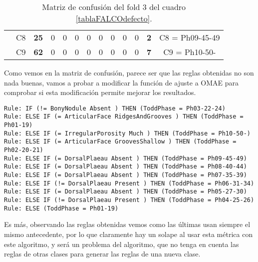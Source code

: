 \begin{table}[H]
{\begin{tabular}{|ccccccccccccc|}
\multicolumn{1}{|c|}{}                                      & \multicolumn{1}{c|}{C8} & \multicolumn{1}{c|}{\textbf{25}} & \multicolumn{1}{c|}{0}          & \multicolumn{1}{c|}{0}          & \multicolumn{1}{c|}{0}  & \multicolumn{1}{c|}{0}  & \multicolumn{1}{c|}{0}  & \multicolumn{1}{c|}{0}  & \multicolumn{1}{c|}{0}  & \multicolumn{1}{c|}{0}  & \multicolumn{1}{c|}{\textbf{2}} & C8 = Ph09-45-49   \\ \cline{2-13}
\multicolumn{1}{|c|}{}                                      & \multicolumn{1}{c|}{C9} & \multicolumn{1}{c|}{\textbf{62}} & \multicolumn{1}{c|}{0}          & \multicolumn{1}{c|}{0}          & \multicolumn{1}{c|}{0}  & \multicolumn{1}{c|}{0}  & \multicolumn{1}{c|}{0}  & \multicolumn{1}{c|}{0}  & \multicolumn{1}{c|}{0}  & \multicolumn{1}{c|}{0}  & \multicolumn{1}{c|}{\textbf{7}} & C9 = Ph10-50-     \\ \hline
\end{tabular}%
}
\caption{Matriz de confusión del fold 3 del cuadro \ref{tablaFALCOdefecto}.}
\end{table}

Como vemos en la matriz de confusión, parece ser que las reglas obtenidas no son nada buenas, vamos a probar a modificar la función de ajuste a OMAE para comprobar si esta modificación permite mejorar los resultados.

\begin{lstlisting}
Rule: IF (!= BonyNodule Absent ) THEN (ToddPhase = Ph03-22-24)
Rule: ELSE IF (= ArticularFace RidgesAndGrooves ) THEN (ToddPhase = Ph01-19)
Rule: ELSE IF (= IrregularPorosity Much ) THEN (ToddPhase = Ph10-50-)
Rule: ELSE IF (= ArticularFace GroovesShallow ) THEN (ToddPhase = Ph02-20-21)
Rule: ELSE IF (= DorsalPlaeau Absent ) THEN (ToddPhase = Ph09-45-49)
Rule: ELSE IF (= DorsalPlaeau Absent ) THEN (ToddPhase = Ph08-40-44)
Rule: ELSE IF (= DorsalPlaeau Absent ) THEN (ToddPhase = Ph07-35-39)
Rule: ELSE IF (!= DorsalPlaeau Present ) THEN (ToddPhase = Ph06-31-34)
Rule: ELSE IF (= DorsalPlaeau Absent ) THEN (ToddPhase = Ph05-27-30)
Rule: ELSE IF (!= DorsalPlaeau Present ) THEN (ToddPhase = Ph04-25-26)
Rule: ELSE (ToddPhase = Ph01-19)
\end{lstlisting}

Es más, observando las reglas obtenidas vemos como las últimas usan siempre el mismo antecedente, por lo que claramente hay un solape al usar esta métrica con este algoritmo, y será un problema del algoritmo, que no tenga en cuenta las reglas de otras clases para generar las reglas de una nueva clase.

